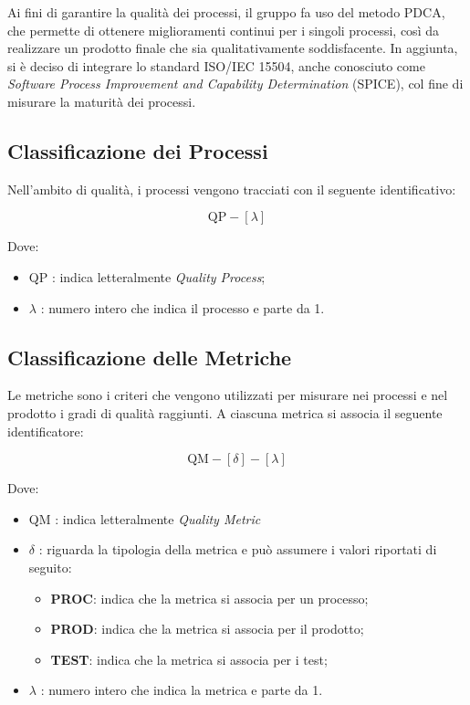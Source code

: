 Ai fini di garantire la qualità dei processi, il gruppo fa uso del metodo PDCA, che permette di ottenere miglioramenti continui per i singoli processi, così da realizzare un prodotto finale che sia qualitativamente soddisfacente. In aggiunta, si è deciso di integrare lo standard ISO/IEC 15504, anche conosciuto come \textit{Software Process Improvement and Capability Determination} (SPICE), col fine di misurare la maturità dei processi.

\subsection{Classificazione dei Processi}

Nell'ambito di qualità, i processi vengono tracciati con il seguente identificativo:

\[
		\text{QP}-[\lambda]
\]

Dove: 

\begin{itemize}
	\item QP : indica letteralmente \textit{Quality Process};
	\item \(\lambda\) : numero intero che indica il processo e parte da 1.
\end{itemize}

\subsection{Classificazione delle Metriche}

Le metriche sono i criteri che vengono utilizzati per misurare nei processi e nel prodotto i gradi di qualità raggiunti. A ciascuna metrica si associa il seguente identificatore:

\[
		\text{QM}-[\delta]-[\lambda]
\]

Dove: 

\begin{itemize}
	\item QM : indica letteralmente \textit{Quality Metric}
	\item \(\delta\) : riguarda la tipologia della metrica e può assumere i valori riportati di seguito:
		\begin{itemize}
			\item \textbf{PROC}: indica che la metrica si associa per un processo;
			\item \textbf{PROD}: indica che la metrica si associa per il prodotto;
			\item \textbf{TEST}: indica che la metrica si associa per i test;
		\end{itemize}
	\item \(\lambda\) : numero intero che indica la metrica e parte da 1.
\end{itemize}

